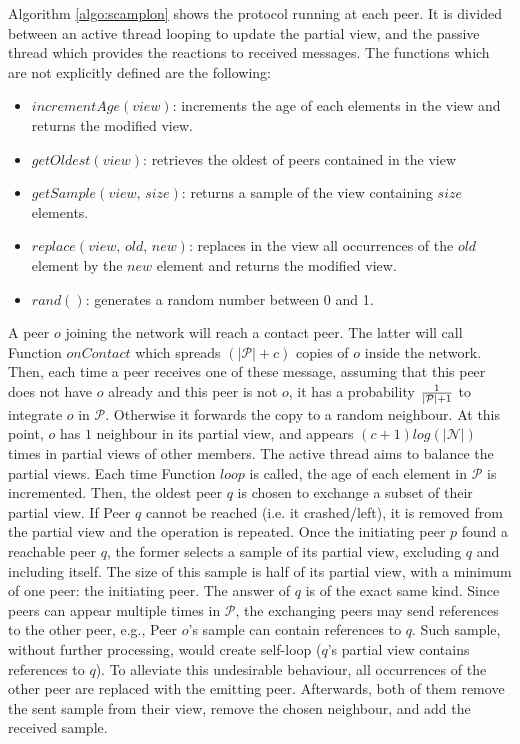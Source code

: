 \begin{asparadesc}
\item [Algorithm]\ref{algo:scamplon} shows the \SCAMPLON{} protocol running at
  each peer. It is divided between an active thread looping to update the
  partial view, and the passive thread which provides the reactions to received
  messages. The functions which are not explicitly defined are the following:
  \begin{itemize}
  \item $incrementAge(view)$: increments the age of each elements in the view
    and returns the modified view.
  \item $getOldest(view)$: retrieves the oldest of peers contained in the view
  \item $getSample(view, \, size)$: returns a sample of the view containing
    $size$ elements.
  \item $replace(view,\,old,\,new)$: replaces in the view all occurrences of
    the $old$ element by the $new$ element and returns the modified view.
  \item $rand()$: generates a random number between 0 and 1.
  \end{itemize}
  A peer $o$ joining the network will reach a contact peer. The latter will
  call Function $onContact$ which spreads $(|\mathcal{P}|+c)$ copies of $o$
  inside the network. Then, each time a peer receives one of these message,
  assuming that this peer does not have $o$ already and this peer is not $o$,
  it has a probability $1\over{|\mathcal{P}|+1}$ to integrate $o$ in
  $\mathcal{P}$. Otherwise it forwards the copy to a random neighbour.  At this
  point, $o$ has $1$ neighbour in its partial view, and appears
  $(c+1)log(|\mathcal{N}|)$ times in partial views of other members. The active
  thread aims to balance the partial views. Each time Function $loop$ is
  called, the age of each element in $\mathcal{P}$ is incremented. Then, the
  oldest peer $q$ is chosen to exchange a subset of their partial view. If Peer
  $q$ cannot be reached (i.e. it crashed/left), it is removed from the partial
  view and the operation is repeated. Once the initiating peer $p$ found a
  reachable peer $q$, the former selects a sample of its partial view,
  excluding $q$ and including itself. The size of this sample is half of its
  partial view, with a minimum of one peer: the initiating peer. The answer of
  $q$ is of the exact same kind. Since peers can appear multiple times in
  $\mathcal{P}$, the exchanging peers may send references to the other peer,
  e.g., Peer $o$'s sample can contain references to $q$. Such sample, without
  further processing, would create self-loop ($q$'s partial view contains
  references to $q$). To alleviate this undesirable behaviour, all occurrences
  of the other peer are replaced with the emitting peer.  Afterwards, both of
  them remove the sent sample from their view, remove the chosen neighbour, and
  add the received sample.
\end{asparadesc}

